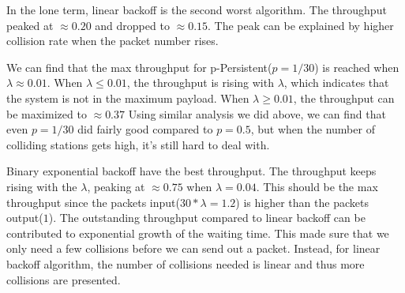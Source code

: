 \documentclass{article}
\begin{document}
In the lone term, linear backoff is the second worst algorithm.
The throughput peaked at $\approx 0.20$ and dropped to $\approx 0.15$.
The peak can be explained by higher collision rate when the packet number rises.

We can find that the max throughput for p-Persistent($p = 1/30$) is reached when $\lambda \approx 0.01$.
When $\lambda \le 0.01$, the throughput is rising with $\lambda$, which indicates that the system is not in the maximum payload.
When $\lambda \ge 0.01$, the throughput can be maximized to $\approx 0.37$
Using similar analysis we did above, we can find that even $p = 1/30$ did fairly good compared to $p=0.5$, but when the number of colliding stations gets high, it's still hard to deal with.

Binary exponential backoff have the best throughput.
The throughput keeps rising with the $\lambda$, peaking at $\approx 0.75$ when $\lambda = 0.04$.
This should be the max throughput since the packets input($30 * \lambda = 1.2$) is higher than the packets output($1$).
The outstanding throughput compared to linear backoff can be contributed to exponential growth of the waiting time.
This made sure that we only need a few collisions before we can send out a packet.
Instead, for linear backoff algorithm, the number of collisions needed is linear and thus more collisions are presented.
\end{document}
